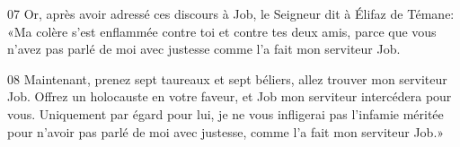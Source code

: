 07 Or, après avoir adressé ces discours à Job, le Seigneur dit à Élifaz de Témane: «Ma colère s’est enflammée contre toi et contre tes deux amis, parce que vous n’avez pas parlé de moi avec justesse comme l’a fait mon serviteur Job.

08 Maintenant, prenez sept taureaux et sept béliers, allez trouver mon serviteur Job. Offrez un holocauste en votre faveur, et Job mon serviteur intercédera pour vous. Uniquement par égard pour lui, je ne vous infligerai pas l’infamie méritée pour n’avoir pas parlé de moi avec justesse, comme l’a fait mon serviteur Job.»
